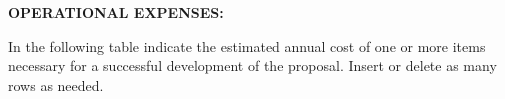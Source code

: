 \documentclass[10pt]{article}
\begin{document}
\begin{comment}
\textbf{\uppercase{VIAJES DOMESTICOS: }}
\vspace{15pt}

\begin{tabular}{l|l|l|}
\cline{2-3}
                             & Destino & No.\ de días \\ \cline{2-3} 
                             &             &             \\ \hline
\multicolumn{1}{|l|}{Año 1} &   Desconocido          &     5        \\ \hline
\multicolumn{1}{|l|}{Año 2} &      Desconocido       &     5        \\ \hline
\multicolumn{1}{|l|}{Year 3} &          &           \\ \hline
\end{tabular}
\vspace{15pt}

El objetivo principal de los viajes domésticos es el de diseminar el trabajo realizado durante la ejecución del proyecto en la Comunidad chilena de Machine Learning, Descubrimiento de Conocimiento desde Grandes Bases de Datos y Reconocimiento de Patrones. Se espera también comenzar a colaborar con distintos investigadores de universidades chilenas con temas afines. Se planifica asistir a 2 conferencias nacionales durante la ejecución del proyecto. La tarifa aérea estimada es de M\$250 y un viatico diario de M\$60 por 5 días. El costo total por año asciende a M\$550.

\end{comment}

\pagebreak{}
\noindent \textbf{\uppercase{OPERATIONAL EXPENSES:}}

\vspace{15pt}
\noindent In the following table indicate the estimated annual cost of one or more items
necessary for a successful development of the proposal. Insert or delete as many
rows as needed.
\end{document}
